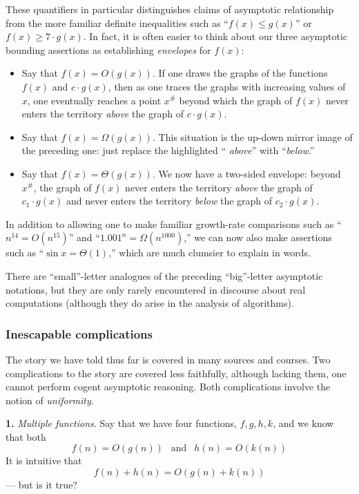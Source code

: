 These quantifiers in particular distinguishes claims of asymptotic
relationship from the more familiar definite inequalities such as
``$f(x) \leq g(x)$'' or $f(x) \geq 7 \cdot g(x)$.  In fact, it is
often easier to think about our three asymptotic bounding assertions
as establishing {\em envelopes} for $f(x)$:
\begin{itemize}
\item
Say that $f(x) = O(g(x))$.  If one draws the graphs of the functions
$f(x)$ and $c \cdot g(x)$, then as one traces the graphs with
increasing values of $x$, one eventually reaches a point $x^{\#}$
beyond which the graph of $f(x)$ never enters the territory {\em
  above} the graph of $c \cdot g(x)$.
\item
Say that $f(x) = \Omega(g(x))$.  This situation is the up-down mirror
image of the preceding one: just replace the highlighted ``{\em
above}'' with ``{\em below}.''
\item
Say that $f(x) = \Theta(g(x))$.  We now have a two-sided envelope:
beyond $x^{\#}$, the graph of $f(x)$ never enters the territory {\em
  above} the graph of $c_1 \cdot g(x)$ and never enters the territory
{\em below} the graph of $c_2 \cdot g(x)$.
\end{itemize}
In addition to allowing one to make familiar growth-rate comparisons
such as ``$n^{14} = O(n^{15})$'' and ``$1.001^n = \Omega(n^{1000})$,''
we can now also make assertions such as ``$\sin x = \Theta(1)$,''
which are much clumsier to explain in words.

\medskip

%
There are ``small''-letter analogues of the preceding ``big''-letter
asymptotic notations, but they are only rarely encountered in
discourse about real computations (although they do arise in the
analysis of algorithms).

\subsubsection{Inescapable complications}

The story we have told thus far is covered in many sources and
courses.  Two complications to the story are covered less faithfully,
although lacking them, one cannot perform cogent asymptotic
reasoning.  Both complications involve the notion of {\em uniformity}.

\noindent
{\bf 1.}
{\em Multiple functions}.
%
Say that we have four functions, $f, g, h, k$, and we know that both
\[ f(n) = O(g(n)) \ \ \mbox{ and } \ \ h(n) = O(k(n)) \]
It is intuitive that
\[ f(n) + h(n) = O(g(n) + k(n)) \]
--- but is it true?

